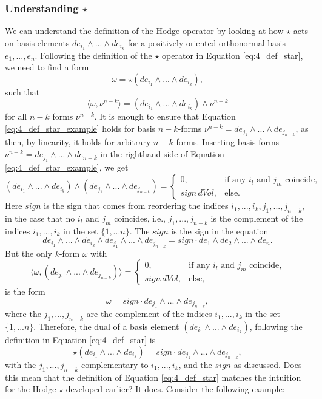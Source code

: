\subsubsection{Understanding $\star$}
We can understand the definition of the Hodge operator by looking at how $\star$ acts on basis elements $ de_{i_1}\wedge...\wedge de_{i_k}$ for a positively oriented orthonormal basis $e_1,...,e_n$. Following the definition of the $\star$ operator in Equation \ref{eq:4_def_star}, we need to find a form 
\[\omega = \star (de_{i_1}\wedge...\wedge de_{i_k}),\] 
such that
\begin{equation}\langle \omega, \nu^{n-k} \rangle = (de_{i_1}\wedge...\wedge de_{i_k}) \wedge \nu^{n-k}
\label{eq:4_def_star_example}\end{equation}
for all $n-k$ forms $\nu^{n-k}$. It is enough to ensure that Equation \ref{eq:4_def_star_example} holds for basis $n-k$-forms $\nu^{n-k} = de_{j_1} \wedge ... \wedge de_{j_{n-k}}$, as then, by linearity, it holds for arbitrary $n-k$-forms. Inserting basis forms $\nu^{n-k} = de_{j_1}\wedge...\wedge de_{n-k}$ in the righthand side of Equation \ref{eq:4_def_star_example}, we get
\[(de_{i_1}\wedge...\wedge de_{i_k}) \wedge (de_{j_1} \wedge ... \wedge de_{j_{n-k}}) = 
\begin{cases}  
0, & \text{if any $i_l$ and $j_m$ coincide,} \\
sign \, dVol,  & \text{else.} 
\end{cases}\]
Here $sign$ is the sign that comes from reordering the indices $i_1,...,i_k,j_1,...,j_{n-k}$, in the case that no $i_l$ and $j_m$ coincides, i.e., $j_1,...,j_{n-k}$ is the complement of the indices $i_1,...,i_k$ in the set $\{1,...n\}$. The $sign$ is the sign in the equation
\[de_{i_1}\wedge...\wedge de_{i_k} \wedge de_{j_1}\wedge...\wedge de_{j_{n-k}} = sign \cdot de_1\wedge de_2 \wedge ... \wedge de_n .\]
But the only $k$-form $\omega$ with
\[\langle \omega,  (de_{j_1} \wedge ... \wedge de_{j_{n-k}})\rangle = \begin{cases}  
0, & \text{if any $i_l$ and $j_m$ coincide,} \\
sign \, dVol,  & \text{else,} 
\end{cases}\]
is the form 
\[\omega = sign \cdot de_{j_1} \wedge ... \wedge de_{j_{n-k}},\]
where the $j_1,...,j_{n-k}$ are the complement of the indices $i_1,...,i_k$ in the set $\{1,...n\}$. Therefore, the dual of a basis element $(de_{i_1}\wedge...\wedge de_{i_k})$, following the definition in Equation \ref{eq:4_def_star} is
\[\]
\begin{equation}\star (de_{i_1}\wedge...\wedge de_{i_k}) = sign \cdot de_{j_1} \wedge ... \wedge de_{j_{n-k}}
\label{eq:4_star_on_basis}, \end{equation}
\[\]
with the $j_1,...,j_{n-k}$ complementary to $i_1,...,i_k$, and the $sign$ as discussed. Does this mean that the definition of Equation \ref{eq:4_def_star} matches the intuition for the Hodge $\star$ developed earlier?  It does. Consider the following example:
